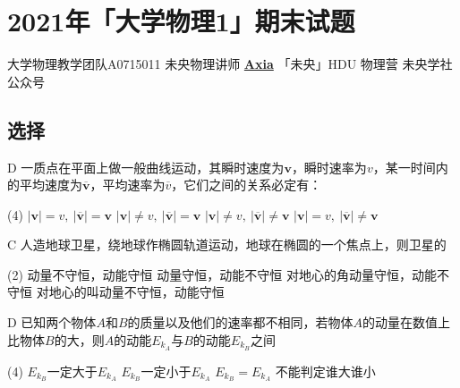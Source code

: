 \chapter{2021年「大学物理1」\hdu 期末试题}
\date{2021年6月??日}{大学物理教学团队}{A0715011}
{未央物理讲师 \href{https://qm.qq.com/q/UPbGudx8cK}{\textbf{Axia}}}
{}{「未央」HDU 物理营}
{}{未央学社公众号}
\section{选择}
\begin{choice}{D}{}
 一质点在平面上做一般曲线运动，其瞬时速度为$\boldsymbol{v}$，瞬时速率为$v$，某一时间内的平均速度为$\overline{\boldsymbol{v}}$，平均速率为$\overline{v}$，它们之间的关系必定有：
\begin{tasks}(4)
\task $\left|\boldsymbol{v}\right|=v,\ \left|\overline{\boldsymbol{v}}\right|=\boldsymbol{v}$
\task $\left|\boldsymbol{v}\right|\neq v,\ \left|\overline{\boldsymbol{v}}\right|=\boldsymbol{v}$
\task $\left|\boldsymbol{v}\right|\neq v,\ \left|\overline{\boldsymbol{v}}\right|\neq\boldsymbol{v}$
\task $\left|\boldsymbol{v}\right|=v,\ \left|\overline{\boldsymbol{v}}\right|\neq\boldsymbol{v}$
\end{tasks}
\end{choice}
\begin{choice}{C}{}
人造地球卫星，绕地球作椭圆轨道运动，地球在椭圆的一个焦点上，则卫星的
\begin{tasks}(2)
\task 动量不守恒，动能守恒
\task 动量守恒，动能不守恒
\task 对地心的角动量守恒，动能不守恒
\task 对地心的叫动量不守恒，动能守恒
\end{tasks}
\end{choice}
\begin{choice}{D}{}
已知两个物体$A$和$B$的质量以及他们的速率都不相同，若物体$A$的动量在数值上比物体$B$的大，则$A$的动能$E_{k_A}$与$B$的动能$E_{k_B}$之间
\begin{tasks}(4)
\task $E_{k_B}$一定大于$E_{k_A}$
\task $E_{k_B}$一定小于$E_{k_A}$
\task $E_{k_B}=E_{k_A}$
\task 不能判定谁大谁小
\end{tasks}
\end{choice}


